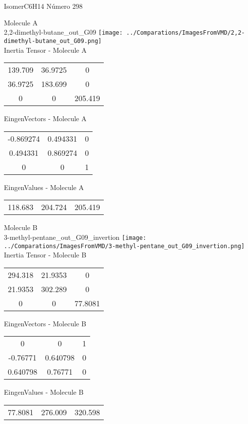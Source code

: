  \newpage

\vtab[-2cm]
\begin{center}
{\large IsomerC6H14 \tab Número 298}
\end{center}
\begin{multicols}{2}
\begin{center}

Molecule A \\ 
2,2-dimethyl-butane\_out\_G09
\texttt{[image: ../Comparations/ImagesFromVMD/2,2-dimethyl-butane\_out\_G09.png]}
\\
Inertia Tensor - Molecule A \\
\vtab

\begin{tabular}{|c c c|}
139.709	 & 	36.9725	 & 	0	 \\
36.9725	 & 	183.699	 & 	0	 \\
0	 & 	0	 & 	205.419
\end{tabular}

\vtab
 EingenVectors - Molecule A     \\
\vtab
\begin{tabular}{|c c c|}
-0.869274	 & 	0.494331	 & 	0	 \\
0.494331	 & 	0.869274	 & 	0	 \\
0	 & 	0	 & 	1
\end{tabular}

\vtab
 EingenValues - Molecule A     \\
\vtab
\begin{tabular}{|c c c|}
118.683	 & 	204.724	 & 	205.419	 \\
\end{tabular}
\columnbreak

Molecule B \\ 
3-methyl-pentane\_out\_G09\_invertion
\texttt{[image: ../Comparations/ImagesFromVMD/3-methyl-pentane\_out\_G09\_invertion.png]}
\\
Inertia Tensor - Molecule B \\
\vtab

\begin{tabular}{|c c c|}
294.318	 & 	21.9353	 & 	0	 \\
21.9353	 & 	302.289	 & 	0	 \\
0	 & 	0	 & 	77.8081
\end{tabular}

\vtab
 EingenVectors - Molecule B     \\
\vtab
\begin{tabular}{|c c c|}
0	 & 	0	 & 	1	 \\
-0.76771	 & 	0.640798	 & 	0	 \\
0.640798	 & 	0.76771	 & 	0
\end{tabular}

\vtab
 EingenValues - Molecule B     \\
\vtab
\begin{tabular}{|c c c|}
77.8081	 & 	276.009	 & 	320.598	 \\
\end{tabular}

\end{center}
\end{multicols}
